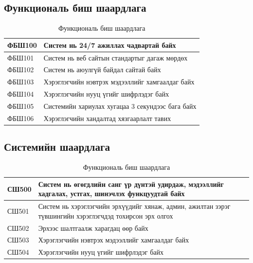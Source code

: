 \subsection{Функциональ биш шаардлага}

\begin{table}[H]
    \centering
    \label{my-label-5}
    \begin{tabular}{|p{1.7cm}|p{12cm}|}
        \hline
        ФБШ100 & Систем нь 24/7 ажиллах чадвартай байх\\ \hline
        ФБШ101 & Систем нь веб сайтын стандартыг дагаж мөрдөх\\ \hline
        ФБШ102 & Систем нь аюулгүй байдал сайтай байх\\ \hline
        ФБШ103 & Хэрэглэгчийн нэвтрэх мэдээллийг хамгаалдаг байх\\ \hline
        ФБШ104 & Хэрэглэгчийн нууц үгийг шифрлэдэг байх\\ \hline
        ФБШ105 & Системийн хариулах хугацаа 3 секундээс бага байх\\ \hline
        ФБШ106 & Хэрэглэгчийн хандалтад хязгаарлалт тавих\\ \hline
    \end{tabular}
    \caption{Функциональ биш шаардлага}
\end{table}

\subsection{Системийн шаардлага}

\begin{table}[H]
    \centering
    \label{my-label-6}
    \begin{tabular}{|p{1.7cm}|p{12cm}|}
        \hline
        СШ500 & Систем нь өгөгдлийн санг үр дүнтэй удирдаж, мэдээллийг хадгалах,
        устгах, шинэчлэх функцуудтай байх\\ \hline
        СШ501 & Систем нь хэрэглэгчийн эрхүүдийг хянаж, админ, ажилтан зэрэг
        түвшингийн хэрэглэгчдэд тохирсон эрх олгох\\ \hline
        СШ502 & Эрхээс шалтгаалж харагдац өөр байх\\ \hline
        СШ503 & Хэрэглэгчийн нэвтрэх мэдээллийг хамгаалдаг байх\\ \hline
        СШ504 & Хэрэглэгчийн нууц үгийг шифрлэдэг байх\\ \hline
    \end{tabular}
    \caption{Функциональ биш шаардлага}
\end{table}

